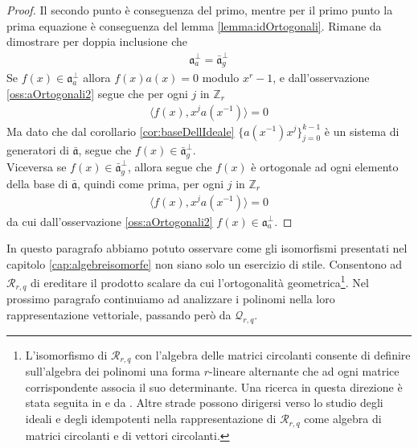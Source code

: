 \begin{proof}
   Il secondo punto è conseguenza del primo, mentre per il primo punto la prima equazione è conseguenza del lemma \ref{lemma:idOrtogonali}.
   Rimane da dimostrare per doppia inclusione che
   \begin{align*}
        \mathfrak{a}_{a}^{\perp} = \bar{\mathfrak{a}}_{g}^{\perp}
    \end{align*}
    Se $f(x) \in \mathfrak{a}_{a}^{\perp}$ allora $f(x)a(x) = 0$ modulo $x^r - 1$, e dall'osservazione \ref{oss:aOrtogonali2} segue che per ogni $j$ in $\mathbb{Z}_{r}$
    \begin{align*}
       \langle f(x), x^{j}a(x^{-1}) \rangle = 0
    \end{align*}
    Ma dato che dal corollario \ref{cor:baseDellIdeale} $\lbrace a(x^{-1})x^{j} \rbrace_{j=0}^{k-1}$ è un sistema di generatori di  $\bar{\mathfrak{a}}$, segue che $f(x) \in \bar{\mathfrak{a}}_{g}^{\perp}$. \\
    Viceversa se $f(x) \in \bar{\mathfrak{a}}_{g}^{\perp}$, allora segue che $f(x)$ è ortogonale ad ogni elemento della base di $\bar{\mathfrak{a}}$, quindi come prima, per ogni $j$ in $\mathbb{Z}_{r}$
    \begin{align*}
       \langle f(x), x^{j}a(x^{-1}) \rangle = 0
    \end{align*}
    da cui dall'osservazione \ref{oss:aOrtogonali2} $f(x) \in \mathfrak{a}_{a}^{\perp}$.
\end{proof}



In questo paragrafo abbiamo potuto osservare come gli isomorfismi presentati nel capitolo \ref{cap:algebreisomorfe} non siano solo un esercizio di stile. Consentono ad $\mathcal{R}_{r,q}$ di ereditare il prodotto scalare da cui l'ortogonalità geometrica\footnote{L'isomorfismo di $\mathcal{R}_{r,q}$ con l'algebra delle matrici circolanti consente di definire sull'algebra dei polinomi una forma $r$-lineare alternante che ad ogni matrice corrispondente associa il suo determinante. Una ricerca in questa direzione è stata seguita in \cite{montabone} e da \cite{wynjones}. Altre strade possono dirigersi verso lo studio degli ideali e degli idempotenti nella rappresentazione di $\mathcal{R}_{r,q}$ come algebra di matrici circolanti e di vettori circolanti.}. Nel prossimo paragrafo continuiamo ad analizzare i polinomi nella loro rappresentazione vettoriale, passando però da $\mathcal{Q}_{r,q}$.


